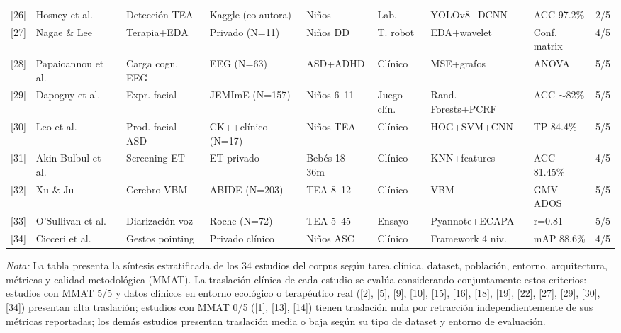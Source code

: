 \documentclass[3p,twocolumn,times]{elsarticle}
\begin{document}
\begin{table}[h]
{\begin{tabular}{clllllllc}
				{[26]} & Hosney et al.\      & Detección TEA       & Kaggle (co-autora) & Niños           & Lab.       & YOLOv8+DCNN           & ACC 97.2\%     & 2/5 \\
				{[27]} & Nagae \& Lee        & Terapia+EDA         & Privado (N=11)     & Niños DD        & T. robot   & EDA+wavelet           & Conf. matrix   & 4/5 \\
				{[28]} & Papaioannou et al.\ & Carga cogn. EEG     & EEG (N=63)         & ASD+ADHD        & Clínico    & MSE+grafos            & ANOVA          & 5/5 \\
				{[29]} & Dapogny et al.\     & Expr. facial        & JEMImE (N=157)     & Niños 6--11     & Juego clín.& Rand. Forests+PCRF    & ACC $\sim$82\% & 5/5 \\
				{[30]} & Leo et al.\         & Prod. facial ASD    & CK++clínico (N=17) & Niños TEA       & Clínico    & HOG+SVM+CNN           & TP 84.4\%      & 5/5 \\
				{[31]} & Akin-Bulbul et al.\ & Screening ET        & ET privado         & Bebés 18--36m   & Clínico    & KNN+features          & ACC 81.45\%    & 4/5 \\
				{[32]} & Xu \& Ju            & Cerebro VBM         & ABIDE (N=203)      & TEA 8--12       & Clínico    & VBM                   & GMV-ADOS       & 5/5 \\
				{[33]} & O'Sullivan et al.\  & Diarización voz     & Roche (N=72)       & TEA 5--45       & Ensayo     & Pyannote+ECAPA        & r=0.81         & 5/5 \\
				{[34]} & Cicceri et al.\     & Gestos pointing     & Privado clínico    & Niños ASC       & Clínico    & Framework 4 niv.      & mAP 88.6\%     & 4/5 \\
				\bottomrule
		\end{tabular}}
		\begin{minipage}{\textwidth}
			\vspace{6pt}
			\small\textit{Nota:} La tabla presenta la síntesis estratificada de los 34 estudios
			del corpus según tarea clínica, dataset, población, entorno, arquitectura, métricas
			y calidad metodológica (MMAT). La traslación clínica de cada estudio se evalúa
			considerando conjuntamente estos criterios: estudios con MMAT 5/5 y datos clínicos
			en entorno ecológico o terapéutico real ([2], [5], [9], [10], [15], [16], [18],
			[19], [22], [27], [29], [30], [34]) presentan alta traslación; estudios con MMAT
			0/5 ([1], [13], [14]) tienen traslación nula por retracción independientemente de
			sus métricas reportadas; los demás estudios presentan traslación media o baja según
			su tipo de dataset y entorno de evaluación.
		\end{minipage}
	\end{table}
	\twocolumn
	
\end{document}
